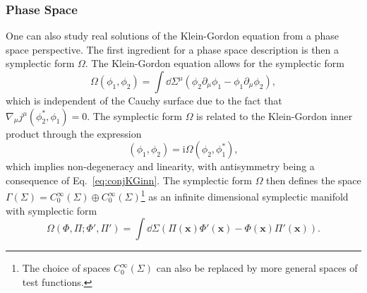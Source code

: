 \documentclass[letterpaper,12pt,titlepage,oneside,final]{book}
\newcommand{\ii}{\mathrm{i}}
\begin{document}


\subsubsection*{Phase Space}

One can also study real solutions of the Klein-Gordon equation from a phase space perspective. The first ingredient for a phase space description is then a symplectic form $\Omega$. The Klein-Gordon equation allows for the symplectic form
\begin{equation}
    \Omega(\phi_1,\phi_2) = \int \dd \Sigma^\mu(\phi_2\partial_\mu \phi_1 - \phi_1 \partial_\mu \phi_2),
\end{equation}
which is independent of the Cauchy surface due to the fact that $\nabla_\mu j^\mu(\phi_2^*,\phi_1) = 0$. The symplectic form $\Omega$ is related to the Klein-Gordon inner product through the expression
\begin{equation}
    (\phi_1,\phi_2) = \ii \Omega(\phi_2,\phi_1^*),
\end{equation}
which implies non-degeneracy and linearity, with antisymmetry being a consequence of Eq.~\eqref{eq:conjKGinn}. The symplectic form $\Omega$ then defines the space $\Gamma(\Sigma) = C_0^\infty(\Sigma)\oplus C_0^\infty(\Sigma)$\footnote{The choice of spaces $C_0^\infty(\Sigma)$ can also be replaced by more general spaces of test functions.} as an infinite dimensional symplectic manifold with symplectic form
\begin{equation}\label{eq:symplecticKG}
    \Omega(\Phi,\Pi;\Phi',\Pi') = \int \dd \Sigma (\Pi(\bm x)\Phi'(\bm x) - \Phi(\bm x) \Pi'(\bm x)).
\end{equation}
\end{document}
